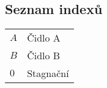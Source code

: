 \subsection*{Seznam indexů}
    \begin{table}[ht!]
        \begin{tabular}{P{.15\textwidth}|p{.75\textwidth}}
        $A$ & Čidlo A \\
        $B$ & Čidlo B \\
        $0$ & Stagnační
        \end{tabular}
    \end{table}